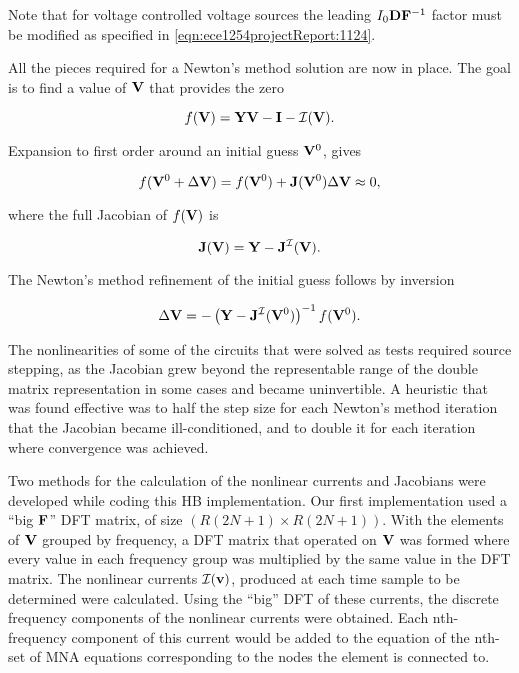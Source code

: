 Note that for voltage controlled voltage sources the leading \( I_0 \mathbf{D} \mathbf{F}^{-1} \) factor must be modified as specified in \cref{eqn:ece1254projectReport:1124}.


All the pieces required for a Newton's method solution are now in place.
The goal is to find a value of \( \mathbf{V} \) that provides the zero

\begin{dmath}\label{eqn:ece1254projectReport:1220}
f(\BV) = \BY \BV - \BI - \mathcal{I}(\BV).
\end{dmath}

Expansion to first order around an initial guess \( \mathbf{V}^0 \), gives

\begin{dmath}\label{eqn:ece1254projectReport:1240}
f( \BV^0 + \Delta \BV ) = f(\BV^0) + \BJ(\BV^0) \Delta \BV \approx 0,
\end{dmath}

where the full Jacobian of \( f(\mathbf{V}) \) is

\begin{dmath}\label{eqn:ece1254projectReport:1260}
\BJ(\BV) = \BY - \BJ^{\mathcal{I}}(\BV).
\end{dmath}

The Newton's method refinement of the initial guess follows by inversion

\begin{dmath}\label{eqn:ece1254projectReport:1280}
\Delta \BV = -\lr{ \BY - \BJ^{\mathcal{I}}(\BV^0) }^{-1} f(\BV^0).
\end{dmath}

The nonlinearities of some of the circuits that were solved as tests required source stepping, as the Jacobian grew beyond the representable range of the double matrix representation in some cases and became uninvertible.
A heuristic that was found effective was to half the step size for each Newton's method iteration that the Jacobian became ill-conditioned, and to double it for each iteration where convergence was achieved.


Two methods for the calculation of the nonlinear currents and Jacobians were developed while coding this HB implementation.
Our first implementation used
a ``big \( \mathbf{F} \)'' DFT matrix, of size \( ( R (2 N + 1 ) \times R (2 N + 1) ) \).
With the elements of \( \mathbf{V} \) grouped by frequency, a DFT matrix that operated on \( \mathbf{V} \) was formed where
every value in each frequency group was multiplied by the same value in the DFT matrix.
The nonlinear currents \( \mathcal{I}(\mathbf{v}) \), produced at each time sample to be determined were calculated.
Using the
``big'' DFT of these currents, the discrete frequency
components of the nonlinear currents were obtained.
Each nth-frequency component of this current would be added
to the equation of the nth-set of MNA equations corresponding to the nodes the element is connected
to.


